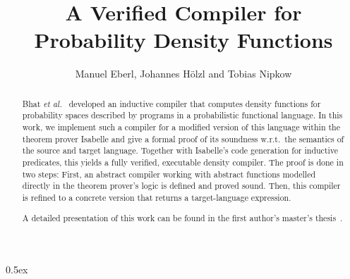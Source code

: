 \documentclass[11pt,a4paper]{article}
\begin{document}
\title{A Verified Compiler for\\ Probability Density Functions}
\author{Manuel Eberl, Johannes H\"olzl and Tobias Nipkow}
\maketitle

\begin{abstract}%
%
Bhat \emph{et al.}\ \cite{bhat13pdf} developed an inductive compiler that computes density functions for
probability spaces described by programs in a probabilistic functional language. In this work, we
implement such a compiler for a modified version of this language within the theorem prover Isabelle
and give a formal proof of its soundness w.r.t.\ the semantics of the source and target language.
Together with Isabelle's code generation for inductive predicates, this yields a fully verified,
executable density compiler. The proof is done in two steps: First, an abstract compiler working
with abstract functions modelled directly in the theorem prover's logic is defined and proved sound.
Then, this compiler is refined to a concrete version that returns a target-language expression.

A detailed presentation of this work can be found in the first author's master's thesis~\cite{eberl}.
%
\end{abstract}

\tableofcontents

\parindent 0pt\parskip 0.5ex





\end{document}

